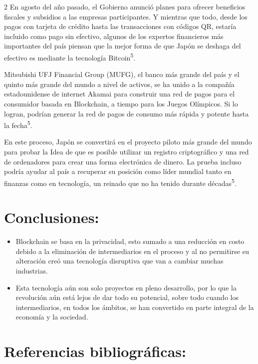 \documentclass[12pt,spanish,Letterpaper,openany]{book}
\begin{document}
\begin {multicols}{2}
En agosto del año pasado, el Gobierno anunció planes para ofrecer beneficios fiscales y subsidios a las empresas participantes. Y mientras que todo, desde los pagos con tarjeta de crédito hasta las transacciones con códigos QR, estaría incluido como pago sin efectivo, algunos de los expertos financieros más importantes del país piensan que la mejor forma de que Japón se deshaga del efectivo es mediante la tecnología Bitcoin\textsuperscript{5}.

Mitsubishi UFJ Financial Group (MUFG), el banco más grande del país y el quinto más grande del mundo a nivel de activos, se ha unido a la compañía estadounidense de internet Akamai para construir una red de pagos para el consumidor basada en Blockchain, a tiempo para los Juegos Olímpicos. Si lo logran, podrían generar la red de pagos de consumo más rápida y potente hasta la fecha\textsuperscript{5}.

En este proceso, Japón se convertirá en el proyecto piloto más grande del mundo para probar la Idea de que es posible utilizar un registro criptográfico y una red de ordenadores para crear una forma electrónica de dinero. La prueba incluso podría ayudar al país a recuperar su posición como líder mundial tanto en finanzas como en tecnología, un reinado que no ha tenido durante décadas\textsuperscript{5}.

\hypertarget{conclusiones-10}{%
\section{Conclusiones:}\label{conclusiones-10}}

\begin{itemize}
\item
  Blockchain se basa en la privacidad, esto sumado a una reducción en costo debido a la eliminación de intermediarios en el proceso y al no permitirse su alteración creó una tecnología disruptiva que van a cambiar muchas industrias.
\item
  Esta tecnología aún son solo proyectos en pleno desarrollo, por lo que la revolución aún está lejos de dar todo su potencial, sobre todo cuando los intermediarios, en todos los ámbitos, se han convertido en parte integral de la economía y la sociedad.
\end{itemize}

\hypertarget{referencias-bibliograficas-10}{%
\section{Referencias bibliográficas:}\label{referencias-bibliograficas-10}}


\end{multicols}
\end{document}
